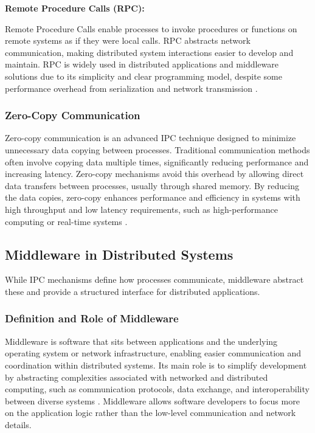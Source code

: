 \vspace{1em}
\newpage
\textbf{Remote Procedure Calls (RPC):}

\vspace{0.4em}
Remote Procedure Calls enable processes to invoke procedures or functions on remote systems as if they were local calls. RPC abstracts network communication, making distributed system interactions easier to develop and maintain. RPC is widely used in distributed applications and middleware solutions due to its simplicity and clear programming model, despite some performance overhead from serialization and network transmission \cite{coulouris2012}.

\subsubsection{Zero-Copy Communication}

Zero-copy communication is an advanced IPC technique designed to minimize unnecessary data copying between processes. Traditional communication methods often involve copying data multiple times, significantly reducing performance and increasing latency. Zero-copy mechanisms avoid this overhead by allowing direct data transfers between processes, usually through shared memory. By reducing the data copies, zero-copy enhances performance and efficiency in systems with high throughput and low latency requirements, such as high-performance computing or real-time systems \cite{raiciu2017}.



\subsection{Middleware in Distributed Systems}

While IPC mechanisms define how processes communicate, middleware abstract these and provide a structured interface for distributed applications.

\subsubsection{Definition and Role of Middleware}

Middleware is software that sits between applications and the underlying operating system or network infrastructure, enabling easier communication and coordination within distributed systems. Its main role is to simplify development by abstracting complexities associated with networked and distributed computing, such as communication protocols, data exchange, and interoperability between diverse systems \cite{bernstein1996}. Middleware allows software developers to focus more on the application logic rather than the low-level communication and network details.


